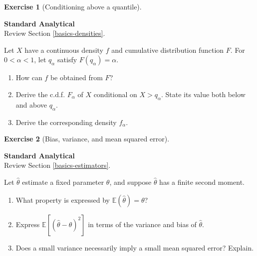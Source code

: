 \documentclass[
  11pt,
]{book}
\providecommand{\tightlist}{%
  \setlength{\itemsep}{0pt}\setlength{\parskip}{0pt}}
\theoremstyle{definition}
\theoremstyle{definition}
\theoremstyle{definition}
\newtheorem{exercise}{Exercise}[chapter]
\theoremstyle{definition}
\theoremstyle{remark}
\begin{document}
\begin{exercisebox}

\begin{exercise}[Conditioning above a quantile]
\protect\hypertarget{exr:basics-quantiles}{}\label{exr:basics-quantiles}

\textbf{Standard \textbar{} Analytical}\\
Review Section \ref{basics-densities}.

Let \(X\) have a continuous density \(f\) and cumulative distribution function \(F\). For \(0<\alpha<1\), let \(q_\alpha\) satisfy \(F(q_\alpha)=\alpha\).

\begin{enumerate}
\def\labelenumi{\arabic{enumi}.}
\tightlist
\item
  How can \(f\) be obtained from \(F\)?
\item
  Derive the c.d.f. \(F_\alpha\) of \(X\) conditional on \(X>q_\alpha\). State its value both below and above \(q_\alpha\).
\item
  Derive the corresponding density \(f_\alpha\).
\end{enumerate}

\end{exercise}

\end{exercisebox}


\begin{exercisebox}

\begin{exercise}[Bias, variance, and mean squared error]
\protect\hypertarget{exr:basics-estimator-properties}{}\label{exr:basics-estimator-properties}

\textbf{Standard \textbar{} Analytical}\\
Review Section \ref{basics-estimators}.

Let \(\widehat\theta\) estimate a fixed parameter \(\theta\), and suppose \(\widehat\theta\) has a finite second moment.

\begin{enumerate}
\def\labelenumi{\arabic{enumi}.}
\tightlist
\item
  What property is expressed by \(\mathbb{E}(\widehat\theta)=\theta\)?
\item
  Express \(\mathbb{E}[(\widehat\theta-\theta)^2]\) in terms of the variance and bias of \(\widehat\theta\).
\item
  Does a small variance necessarily imply a small mean squared error? Explain.
\end{enumerate}

\end{exercise}

\end{exercisebox}
\end{document}
